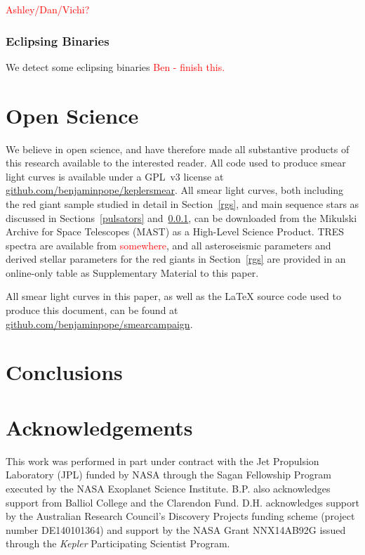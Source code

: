 \documentclass[a4paper,fleqn,usenatbib]{mnras}
\begin{document}
\textcolor{red}{Ashley/Dan/Vichi?}

\subsubsection{Eclipsing Binaries}
\label{ebs}
We detect some eclipsing binaries \textcolor{red}{Ben - finish this.}

\section{Open Science}
\label{open}

We believe in open science, and have therefore made all substantive products of this research available to the interested reader. All code used to produce smear light curves is available under a GPL~v3 license at \url{github.com/benjaminpope/keplersmear}. All smear light curves, both including the red giant sample studied in detail in Section~\ref{rgs}, and main sequence stars as discussed in Sections~\ref{pulsators} and~\ref{ebs}, can be downloaded from the Mikulski Archive for Space Telescopes (MAST) as a High-Level Science Product. TRES spectra are available from \textcolor{red}{somewhere}, and all asteroseismic parameters and derived stellar parameters for the red giants in Section~\ref{rgs} are provided in an online-only table as Supplementary Material to this paper.

All smear light curves in this paper, as well as the \LaTeX{} source code used to produce this document, can be found
at \url{github.com/benjaminpope/smearcampaign}.


\section{Conclusions}
\label{conclusions}



\section*{Acknowledgements} %

This work was performed in part under contract with the Jet Propulsion Laboratory (JPL) funded by NASA through the Sagan Fellowship Program executed by the NASA Exoplanet Science Institute. B.P. also acknowledges support from Balliol College and the Clarendon Fund. D.H. acknowledges support by the Australian Research Council's Discovery Projects funding scheme (project number DE140101364) and support by the NASA Grant NNX14AB92G issued through the \emph{Kepler} Participating Scientist Program.
\end{document}

